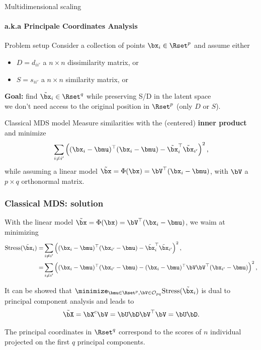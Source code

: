 \documentclass{beamer}\usepackage[]{graphicx}\usepackage[]{color}
\begin{document}
\begin{frame}{Multidimensional scaling}
  \framesubtitle{a.k.a Principale Coordinates Analysis}

  \begin{block}{Problem setup}
  Consider a collection of points $\bx_i\in\Rset^p$ and assume either 
  \begin{itemize}
  \item $D = d_{ii'}$ a $n\times n$ dissimilarity matrix, or
  \item $S = s_{ii'}$ a $n\times n$ similarity matrix, or
  \end{itemize}
  \rsa \alert{\bf Goal:} find $\tilde\bx_i\in\Rset^q$ while preserving S/D in the latent space\\
  
  \rsa we don't need access to the original position in $\Rset^p$ (only $D$ or $S$).
  \end{block}
  
  \begin{block}{Classical MDS model}
    Measure similarities with the (centered) \alert{\bf inner product} and minimize 
    \begin{equation*}
      \sum_{i\neq i'} \left( (\bx_i - \bmu)^\top (\bx_i - \bmu) - \tilde\bx_i^\top \tilde\bx_{i'} \right)^2,
    \end{equation*}
    while assuming a linear model $\tilde\bx = \Phi(\bx) = \bV^\top (\bx_i - \bmu)$, with $\bV$ a $p \times q$ orthonormal matrix.
  \end{block}

\end{frame}

\begin{frame}
  \frametitle{Classical MDS: solution}

  With the linear model $\tilde\bx = \Phi(\bx) = \bV^\top (\bx_i - \bmu)$, we waim at minimizing
  \begin{align*}
    \textrm{Stress}(\tilde\bx_i) = & \sum_{i\neq i'}  \left( (\bx_i - \bmu)^\top (\bx_{i'} - \bmu) - \tilde\bx_i^\top \tilde\bx_{i'} \right)^2, \\
    = & \sum_{i\neq i'} \left( (\bx_i - \bmu)^\top (\bx_{i'} - \bmu) -  (\bx_i - \bmu)^\top \bV \bV^\top (\bx_{i'} - \bmu) \right)^2,
    \end{align*}

  It can be showed that  $\displaystyle \minimize_{\bmu\in\Rset^p, \bV\in\mathcal{O}_{pq}} \textrm{Stress}(\tilde\bx_i)$ is dual to principal component analysis and leads to
  \[
    \tilde\bX = \bX^c \bV = \bU\bD\bV^\top \bV = \bU\bD.
  \]
  
  \alert{\rsa The principal coordinates in $\Rset^q$ correspond to the scores of $n$ individual projected on the first $q$ principal components.}
\end{frame}
\end{document}

